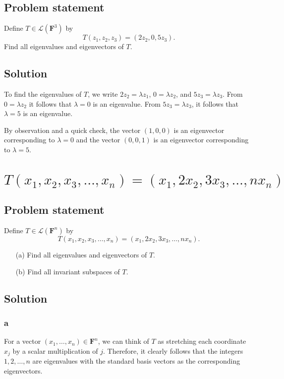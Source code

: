 \documentclass{article}
\begin{document}
\subsection*{Problem statement}
Define $T\in\mathcal{L}(\mathbf{F}^3)$ by
\[T(z_1,z_2,z_3)=(2z_2,0,5z_3).\]
Find all eigenvalues and eigenvectors of $T$.

\subsection*{Solution}
To find the eigenvalues of $T$, we write $2z_2=\lambda z_1$, $0=\lambda z_2$, and $5z_3=\lambda z_3$. 
From $0=\lambda z_2$ it follows that $\lambda=0$ is an eigenvalue. 
From $5z_3=\lambda z_3$, it follows that $\lambda=5$ is an eigenvalue. 

By observation and a quick check, the vector $(1,0,0)$ is an eigenvector corresponding to $\lambda=0$ and the vector $(0,0,1)$ is an eigenvector corresponding to $\lambda=5$.

\clearpage

\section{$T(x_1,x_2,x_3,\ldots,x_n)=(x_1,2x_2,3x_3,\ldots,nx_n)$}
\subsection*{Problem statement}
Define $T\in\mathcal{L}(\mathbf{F}^n)$ by
\[T(x_1,x_2,x_3,\ldots,x_n)=(x_1,2x_2,3x_3,\ldots,nx_n).\]
\begin{enumerate}
    \item[(a)] Find all eigenvalues and eigenvectors of $T$.
    \item[(b)] Find all invariant subspaces of $T$.
\end{enumerate}

\subsection*{Solution}
\subsubsection*{a}
For a vector $(x_1,\ldots,x_n)\in\mathbf{F}^n$, we can think of $T$ as stretching each coordinate $x_j$ by a scalar multiplication of $j$. 
Therefore, it clearly follows that the integers $1,2,\ldots,n$ are eigenvalues with the standard basis vectors as the corresponding eigenvectors.
\end{document}
